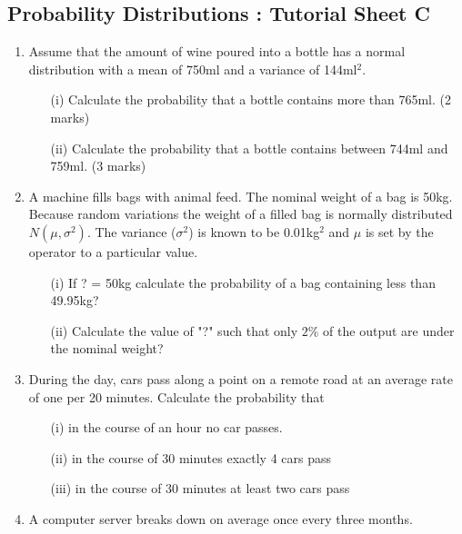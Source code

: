 \documentclass[]{report}
\begin{document}
\subsection*{Probability Distributions : Tutorial Sheet C}
\begin{enumerate}

\item 
Assume that the amount of wine poured into a bottle has a normal distribution with a mean of 750ml and a variance of 144ml$^2$.

\begin{itemize}

\item[(i)]  Calculate the probability that a bottle contains more than 765ml. (2 marks)
\item[(ii)]    Calculate the probability that a bottle contains between 744ml and 759ml. (3 marks)
\end{itemize}
\item A machine fills bags with animal feed. The nominal weight of a bag is 50kg.
Because random variations the weight of a filled bag is normally distributed
$N(\mu, \sigma^2)$. The variance ($\sigma^2$) is known to be 0.01kg$^2$ and $\mu$ is set by the
operator to a particular value.

\begin{itemize}
\item[(i)] If ?  = 50kg calculate the probability of a bag containing less than
49.95kg?
\item[(ii)] Calculate the value of "?" such that only $2\%$ of the output are under the
nominal weight?
\end{itemize}

\item During the day, cars pass along a point on a remote road at an average rate of one per 20 minutes. Calculate the probability that 
\begin{itemize}
\item[(i)]in the course of an hour no car passes. 
\item[(ii)]in the course of 30 minutes exactly 4 cars pass
\item[(iii)]in the course of 30 minutes at least two cars pass
\end{itemize}




\item A computer server breaks down on average once every three months.


\end{enumerate}
\end{document}
